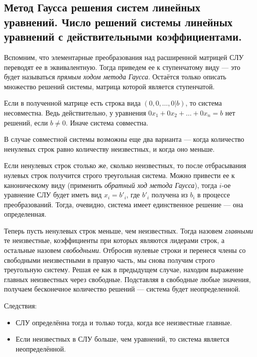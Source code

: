 \documentclass[a4paper, 12pt]{article}
\begin{document}
\subsection{Метод Гаусса решения систем линейных уравнений. Число решений системы линейных уравнений с действительными коэффициентами.}
Вспомним, что элементарные преобразования над расширенной матрицей СЛУ переводят ее в эквивалентную. Тогда приведем ее к ступенчатому виду — это будет называться \textit{прямым ходом метода Гаусса}. Остаётся только описать множество решений системы, матрица которой является ступенчатой.

Если в полученной матрице есть строка вида $\left(0,0,\dots,0|b\right)$, то система несовместна. Ведь действительно, у уравнения $0x_1 + 0x_2 + \dots + 0x_n = b$ нет решений, если $b \neq 0$. Иначе система совместна.

В случае совместной системы возможны еще два варианта — когда количество ненулевых строк равно количеству неизвестных, и когда оно меньше. 

Если ненулевых строк столько же, сколько неизвестных, то после отбрасывания нулевых строк получится строго треугольная система. Можно привести ее к каноническому виду (применить \textit{обратный ход метода Гаусса}), тогда $i$-ое уравнение СЛУ будет иметь вид $x_i = b'_i$, где $b'_i$ получена из $b_i$ в процессе преобразований. Тогда, очевидно, система имеет единственное решение — она определенная. 

Теперь пусть ненулевых строк меньше, чем неизвестных. Тогда назовем \textit{главными} те неизвестные, коэффициенты при которых являются лидерами строк, а остальные назовем \textit{свободными}. Отбросив нулевые строки и перенеся члены со свободными неизвестными в правую часть, мы снова получим строго треугольную систему. Решая ее как в предыдущем случае, находим выражение главных неизвестных через свободные. Подставляя в свободные любые значения, получаем бесконечное количество решений — система будет неопределенной.

Следствия:
\begin{itemize}
\item СЛУ определённа тогда и только тогда, когда все неизвестные главные.
\item Если неизвестных в СЛУ больше, чем уравнений, то система является неопределённой.
\end{itemize}

\end{document}
